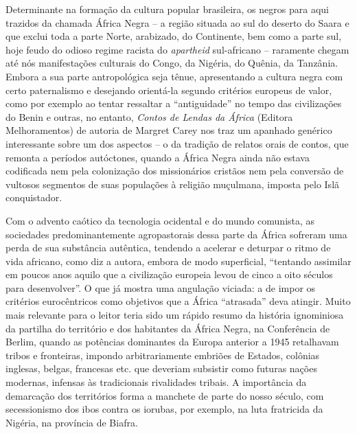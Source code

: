 \documentclass[
  letterpaper,
  DIV=11,
  numbers=noendperiod]{scrreprt}
\begin{document}
\hfill\break

Determinante na formação da cultura popular brasileira, os negros para
aqui trazidos da chamada África Negra -- a região situada ao sul do
deserto do Saara e que exclui toda a parte Norte, arabizado, do
Continente, bem como a parte sul, hoje feudo do odioso regime racista do
\emph{apartheid} sul-africano -- raramente chegam até nós manifestações
culturais do Congo, da Nigéria, do Quênia, da Tanzânia. Embora a sua
parte antropológica seja tênue, apresentando a cultura negra com certo
paternalismo e desejando orientá-la segundo critérios europeus de valor,
como por exemplo ao tentar ressaltar a ``antiguidade'' no tempo das
civilizações do Benin e outras, no entanto, \emph{Contos de Lendas da
África} (Editora Melhoramentos) de autoria de Margret Carey nos traz um
apanhado genérico interessante sobre um dos aspectos -- o da tradição de
relatos orais de contos, que remonta a períodos autóctones, quando a
África Negra ainda não estava codificada nem pela colonização dos
missionários cristãos nem pela conversão de vultosos segmentos de suas
populações à religião muçulmana, imposta pelo Islã conquistador.

Com o advento caótico da tecnologia ocidental e do mundo comunista, as
sociedades predominantemente agropastorais dessa parte da África
sofreram uma perda de sua substância autêntica, tendendo a acelerar e
deturpar o ritmo de vida africano, como diz a autora, embora de modo
superficial, ``tentando assimilar em poucos anos aquilo que a
civilização europeia levou de cinco a oito séculos para desenvolver''. O
que já mostra uma angulação viciada: a de impor os critérios
eurocêntricos como objetivos que a África ``atrasada'' deva atingir.
Muito mais relevante para o leitor teria sido um rápido resumo da
história ignominiosa da partilha do território e dos habitantes da
África Negra, na Conferência de Berlim, quando as potências dominantes
da Europa anterior a 1945 retalhavam tribos e fronteiras, impondo
arbitrariamente embriões de Estados, colônias inglesas, belgas,
francesas etc. que deveriam subsistir como futuras nações modernas,
infensas às tradicionais rivalidades tribais. A importância da
demarcação dos territórios forma a manchete de parte do nosso século,
com secessionismo dos ibos contra os iorubas, por exemplo, na luta
fratricida da Nigéria, na província de Biafra.
\end{document}
